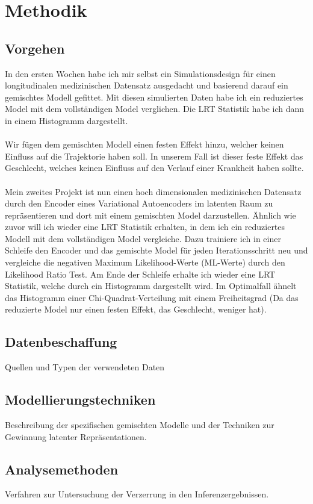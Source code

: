 \documentclass[%
thesis=student,%
coverpage=false,%
titlepage=false,%
headmarks=true, %
german,%
font=libertine, %
math=newpxtx, %
BCOR=5mm,%
coverBCOR=11mm%
]{tumbook}
\theoremstyle{break}
\begin{document}
\chapter{Methodik}
\section{Vorgehen}
In den ersten Wochen habe ich mir selbst ein Simulationsdesign für einen longitudinalen medizinischen Datensatz ausgedacht und basierend darauf ein gemischtes Modell gefittet. Mit diesen simulierten Daten habe ich ein reduziertes Model mit dem vollständigen Model verglichen. Die LRT Statistik habe ich dann in einem Histogramm dargestellt.\\
\\
Wir fügen dem gemischten Modell einen festen Effekt hinzu, welcher keinen Einfluss auf die Trajektorie haben soll. In unserem Fall ist dieser feste Effekt das Geschlecht, welches keinen Einfluss auf den Verlauf einer Krankheit haben sollte.\\
\\
Mein zweites Projekt ist nun einen hoch dimensionalen medizinischen Datensatz durch den Encoder eines Variational Autoencoders im latenten Raum zu repräsentieren und dort mit einem gemischten Model darzustellen. Ähnlich wie zuvor will ich wieder eine LRT Statistik erhalten, in dem ich ein reduziertes Modell mit dem vollständigen Model vergleiche. Dazu trainiere ich in einer Schleife den Encoder und das gemischte Model für jeden Iterationsschritt neu und vergleiche die negativen Maximum Likelihood-Werte (ML-Werte) durch den Likelihood Ratio Test. Am Ende der Schleife erhalte ich wieder eine LRT Statistik, welche durch ein Histogramm dargestellt wird. Im Optimalfall ähnelt das Histogramm einer Chi-Quadrat-Verteilung mit einem Freiheitsgrad (Da das reduzierte Model nur einen festen Effekt, das Geschlecht, weniger hat).\\
\section{Datenbeschaffung}
Quellen und Typen der verwendeten Daten
\section{Modellierungstechniken}
Beschreibung der spezifischen gemischten Modelle und der Techniken zur Gewinnung latenter Repräsentationen.
\section{Analysemethoden}
Verfahren zur Untersuchung der Verzerrung in den Inferenzergebnissen.
\end{document}
